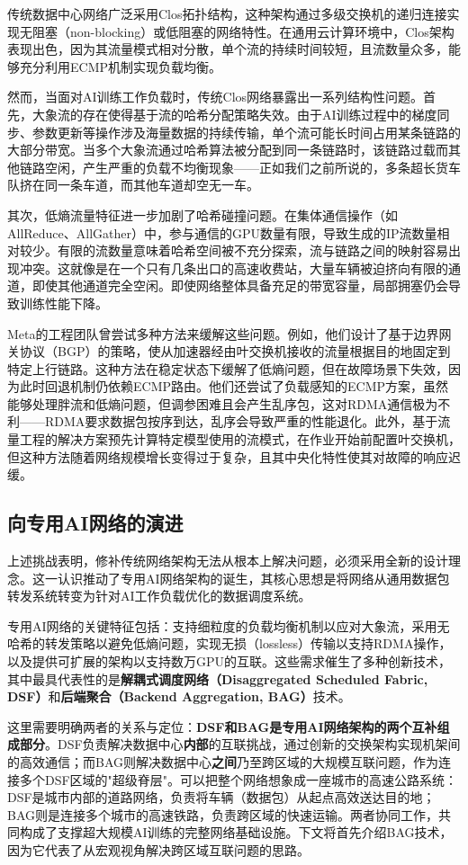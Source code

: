 传统数据中心网络广泛采用Clos拓扑结构，这种架构通过多级交换机的递归连接实现无阻塞（non-blocking）或低阻塞的网络特性。在通用云计算环境中，Clos架构表现出色，因为其流量模式相对分散，单个流的持续时间较短，且流数量众多，能够充分利用ECMP机制实现负载均衡。

然而，当面对AI训练工作负载时，传统Clos网络暴露出一系列结构性问题。首先，大象流的存在使得基于流的哈希分配策略失效。由于AI训练过程中的梯度同步、参数更新等操作涉及海量数据的持续传输，单个流可能长时间占用某条链路的大部分带宽。当多个大象流通过哈希算法被分配到同一条链路时，该链路过载而其他链路空闲，产生严重的负载不均衡现象——正如我们之前所说的，多条超长货车队挤在同一条车道，而其他车道却空无一车。

其次，低熵流量特征进一步加剧了哈希碰撞问题。在集体通信操作（如AllReduce、AllGather）中，参与通信的GPU数量有限，导致生成的IP流数量相对较少。有限的流数量意味着哈希空间被不充分探索，流与链路之间的映射容易出现冲突。这就像是在一个只有几条出口的高速收费站，大量车辆被迫挤向有限的通道，即使其他通道完全空闲。即使网络整体具备充足的带宽容量，局部拥塞仍会导致训练性能下降。

Meta的工程团队曾尝试多种方法来缓解这些问题。例如，他们设计了基于边界网关协议（BGP）的策略，使从加速器经由叶交换机接收的流量根据目的地固定到特定上行链路。这种方法在稳定状态下缓解了低熵问题，但在故障场景下失效，因为此时回退机制仍依赖ECMP路由。他们还尝试了负载感知的ECMP方案，虽然能够处理胖流和低熵问题，但调参困难且会产生乱序包，这对RDMA通信极为不利——RDMA要求数据包按序到达，乱序会导致严重的性能退化。此外，基于流量工程的解决方案预先计算特定模型使用的流模式，在作业开始前配置叶交换机，但这种方法随着网络规模增长变得过于复杂，且其中央化特性使其对故障的响应迟缓。

\subsection{向专用AI网络的演进}

上述挑战表明，修补传统网络架构无法从根本上解决问题，必须采用全新的设计理念。这一认识推动了专用AI网络架构的诞生，其核心思想是将网络从通用数据包转发系统转变为针对AI工作负载优化的数据调度系统。

专用AI网络的关键特征包括：支持细粒度的负载均衡机制以应对大象流，采用无哈希的转发策略以避免低熵问题，实现无损（lossless）传输以支持RDMA操作，以及提供可扩展的架构以支持数万GPU的互联。这些需求催生了多种创新技术，其中最具代表性的是\textbf{解耦式调度网络（Disaggregated Scheduled Fabric, DSF）}和\textbf{后端聚合（Backend Aggregation, BAG）}技术。

这里需要明确两者的关系与定位：\textbf{DSF和BAG是专用AI网络架构的两个互补组成部分}。DSF负责解决数据中心\textbf{内部}的互联挑战，通过创新的交换架构实现机架间的高效通信；而BAG则解决数据中心\textbf{之间}乃至跨区域的大规模互联问题，作为连接多个DSF区域的"超级脊层"。可以把整个网络想象成一座城市的高速公路系统：DSF是城市内部的道路网络，负责将车辆（数据包）从起点高效送达目的地；BAG则是连接多个城市的高速铁路，负责跨区域的快速运输。两者协同工作，共同构成了支撑超大规模AI训练的完整网络基础设施。下文将首先介绍BAG技术，因为它代表了从宏观视角解决跨区域互联问题的思路。

